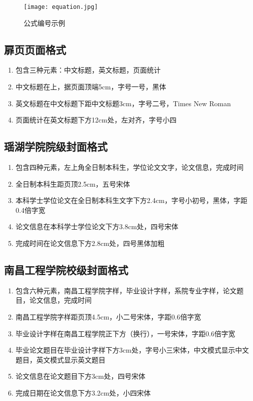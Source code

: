 \documentclass{nitthesis}
\begin{document}
\begin{figure}[H]
    \begin{center}
        \texttt{[image: equation.jpg]}
        \caption{公式编号示例}
        \label{equ.Range}
    \end{center}
\end{figure}

\subsection{扉页页面格式}

\begin{enumerate}
    \item 包含三种元素：中文标题，英文标题，页面统计
    \item 中文标题在上，据页面顶端5cm，字号一号，黑体
    \item 英文标题在中文标题下距中文标题3cm，字号二号，Times New Roman
    \item 页面统计在英文标题下方12cm处，左对齐，字号小四
\end{enumerate}

\subsection{瑶湖学院院级封面格式}

\begin{enumerate}
    \item 包含四种元素，左上角全日制本科生，学位论文文字，论文信息，完成时间
    \item 全日制本科生距页顶2.5cm，五号宋体
    \item 本科学士学位论文在全日制本科生文字下方2.4cm，字号小初号，黑体，字距0.4倍字宽
    \item 论文信息在本科学士学位论文下方3.8cm处，四号宋体
    \item 完成时间在论文信息下方2.8cm处，四号黑体加粗
\end{enumerate}

\subsection{南昌工程学院校级封面格式}

\begin{enumerate}
    \item 包含六种元素，南昌工程学院字样，毕业设计字样，系院专业字样，论文题目，论文信息，完成时间
    \item 南昌工程学院字样距页顶4.5cm，小二号宋体，字距0.6倍字宽
    \item 毕业设计字样在南昌工程学院正下方（换行），一号宋体，字距0.6倍字宽
    \item 毕业论文题目在毕业设计字样下方3cm处，字号小三宋体，中文模式显示中文题目，英文模式显示英文题目
    \item 论文信息在论文题目下方3cm处，四号宋体
    \item 完成日期在论文信息下方3.2cm处，小四宋体
\end{enumerate}
\end{document}
